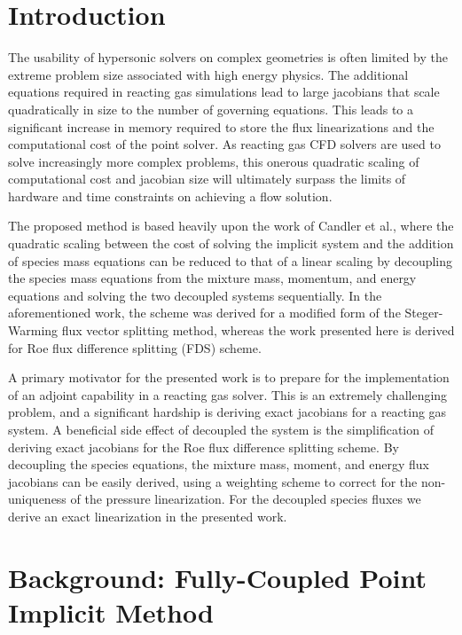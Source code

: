 \documentclass[]{aiaa-tc}%
\begin{document}
\section{Introduction}

The usability of hypersonic solvers on complex geometries is often limited by the extreme problem size associated with high energy physics.  The additional equations required in reacting gas simulations lead to large jacobians that scale quadratically in size to the number of governing equations.  This leads to a significant increase in memory required to store the flux linearizations and the computational cost of the point solver.  As reacting gas CFD solvers are used to solve increasingly more complex problems, this onerous quadratic scaling of computational cost and jacobian size will ultimately surpass the limits of hardware and time constraints on achieving a flow solution.

The proposed method is based heavily upon the work of Candler et al.\cite{candler}, where the quadratic scaling between the cost of solving the implicit system and the addition of species mass equations can be reduced to that of a linear scaling by decoupling the species mass equations from the mixture mass, momentum, and energy equations and solving the two decoupled systems sequentially.  In the aforementioned work, the scheme was derived for a modified form of the Steger-Warming flux vector splitting method\cite{MacCormack}, whereas the work presented here is derived for Roe flux difference splitting (FDS) scheme.

A primary motivator for the presented work is to prepare for the implementation of an adjoint capability in a reacting gas solver.  This is an extremely challenging problem, and a significant hardship is deriving exact jacobians for a reacting gas system.  A beneficial side effect of decoupled the system is the simplification of deriving exact jacobians for the Roe flux difference splitting scheme.  By decoupling the species equations, the mixture mass, moment, and energy flux jacobians can be easily derived\cite{Nishikawa}, using a weighting scheme to correct for the non-uniqueness of the pressure linearization\cite{Shuen}.  For the decoupled species fluxes we derive an exact linearization in the presented work.

\section{Background: Fully-Coupled Point Implicit Method}
\end{document}
